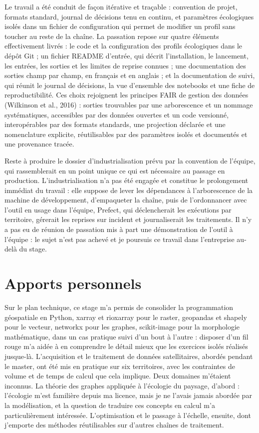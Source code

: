 \documentclass[a4paper,12pt]{report}
\begin{document}
Le travail a été conduit de façon itérative et traçable : convention de projet, formats standard, journal de décisions tenu en continu, et paramètres écologiques isolés dans un fichier de configuration qui permet de modifier un profil sans toucher au reste de la chaîne. La passation repose sur quatre éléments effectivement livrés : le code et la configuration des profils écologiques dans le dépôt Git ; un fichier README d'entrée, qui décrit l'installation, le lancement, les entrées, les sorties et les limites de reprise connues ; une documentation des sorties champ par champ, en français et en anglais ; et la documentation de suivi, qui réunit le journal de décisions, la vue d'ensemble des notebooks et une fiche de reproductibilité. Ces choix rejoignent les principes FAIR de gestion des données (Wilkinson et al., 2016) : sorties trouvables par une arborescence et un nommage systématiques, accessibles par des données ouvertes et un code versionné, interopérables par des formats standards, une projection déclarée et une nomenclature explicite, réutilisables par des paramètres isolés et documentés et une provenance tracée.
 
Reste à produire le dossier d'industrialisation prévu par la convention de l'équipe, qui rassemblerait en un point unique ce qui est nécessaire au passage en production. L'industrialisation n'a pas été engagée et constitue le prolongement immédiat du travail : elle suppose de lever les dépendances à l'arborescence de la machine de développement, d'empaqueter la chaîne, puis de l'ordonnancer avec l'outil en usage dans l'équipe, Prefect, qui déclencherait les exécutions par territoire, gérerait les reprises sur incident et journaliserait les traitements. Il n'y a pas eu de réunion de passation mis à part une démonstration de l'outil à l'équipe : le sujet n'est pas achevé et je poursuis ce travail dans l'entreprise au-delà du stage.

\section{Apports personnels}
Sur le plan technique, ce stage m'a permis de consolider la programmation géospatiale en Python, xarray et rioxarray pour le raster, geopandas et shapely pour le vecteur, networkx pour les graphes, scikit-image pour la morphologie mathématique, dans un cas pratique suivi d'un bout à l'autre : disposer d'un fil rouge m'a aidée à en comprendre le détail mieux que les exercices isolés réalisés jusque-là. L'acquisition et le traitement de données satellitaires, abordés pendant le master, ont été mis en pratique sur six territoires, avec les contraintes de volume et de temps de calcul que cela implique. Deux domaines m'étaient inconnus. La théorie des graphes appliquée à l'écologie du paysage, d'abord : l'écologie m'est familière depuis ma licence, mais je ne l'avais jamais abordée par la modélisation, et la question de traduire ces concepts en calcul m'a particulièrement intéressée. L'optimisation et le passage à l'échelle, ensuite, dont j'emporte des méthodes réutilisables sur d'autres chaînes de traitement.
\end{document}
